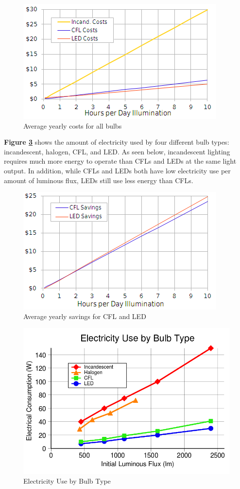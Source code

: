 \documentclass{ceri}
\begin{document}
\begin{figure}[H]
    \centering
    \includegraphics[width=.8\textwidth]{images/Lighting1.png}
    \caption{Average yearly costs for all bulbs}
    \label{L_L1}
 \end{figure}
\newpage 
\textbf{Figure \ref{L_L4}} shows the amount of electricity used by four different bulb types: incandescent, halogen, CFL, and LED. As seen below, incandescent lighting requires much more energy to operate than CFLs and LEDs at the same light output. In addition, while CFLs and LEDs both have low electricity use per amount of luminous flux, LEDs still use less energy than CFLs.

\begin{figure}[H]
    \centering
    \includegraphics[width=.8\textwidth]{images/Lighting2.png}
    \caption{Average yearly savings for CFL and LED}
    \label{L_L3}
 \end{figure}
 \newpage


\begin{figure}[H]
    \centering
    \includegraphics[width=.8\textwidth]{images/Lighting3.png}
    \caption{Electricity Use by Bulb Type}
    \label{L_L4}
 \end{figure}
 
\end{document}

